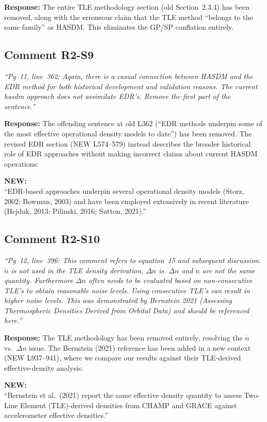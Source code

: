 \documentclass[11pt]{article}
\newcommand{\reviewercomment}[1]{%
  \medskip
  \noindent\textit{\color{reviewblue}#1}%
  \medskip
}
\newcommand{\newtext}[1]{%
  \smallskip
  \noindent\hspace{1em}\begin{minipage}{0.92\textwidth}%
  \color{quotegreen}\textbf{NEW:}\\[2pt]``#1''%
  \end{minipage}%
  \smallskip
}
\begin{document}
\textbf{Response:}
The entire TLE methodology section (old Section~2.3.4) has been removed, along with the erroneous claim that the TLE method ``belongs to the same family'' as HASDM. This eliminates the GP/SP conflation entirely.


\subsection{Comment R2-S9}

\reviewercomment{%
``Pg~11, line~362: Again, there is a casual connection between HASDM and the EDR method for both historical development and validation reasons. The current hasdm approach does not assimilate EDR's. Remove the first part of the sentence.''}

\textbf{Response:}
The offending sentence at old L362 (``EDR methods underpin some of the most effective operational density models to date'') has been removed. The revised EDR section (NEW L574--579) instead describes the broader historical role of EDR approaches without making incorrect claims about current HASDM operations:

\newtext{EDR-based approaches underpin several operational density models (Storz, 2002; Bowman, 2003) and have been employed extensively in recent literature (Hejduk, 2013; Pilinski, 2016; Sutton, 2021).}


\subsection{Comment R2-S10}

\reviewercomment{%
``Pg~12, line~396: This comment refers to equation~15 and subsequent discussion. $\dot{n}$ is not used in the TLE density derivation, $\Delta n$ is. $\Delta n$ and $\dot{n}$ are not the same quantity. Furthermore $\Delta n$ often needs to be evaluated based on non-consecutive TLE's to obtain reasonable noise levels. Using consecutive TLE's can result in higher noise levels. This was demonstrated by Bernstein 2021 (Assessing Thermospheric Densities Derived from Orbital Data) and should be referenced here.''}

\textbf{Response:}
The TLE methodology has been removed entirely, resolving the $\dot{n}$ vs.\ $\Delta n$ issue. The Bernstein (2021) reference has been added in a new context (NEW L937--941), where we compare our results against their TLE-derived effective-density analysis:

\newtext{Bernstein et al.\ (2021) report the same effective density quantity to assess Two-Line Element (TLE)-derived densities from CHAMP and GRACE against accelerometer effective densities.}
\end{document}
